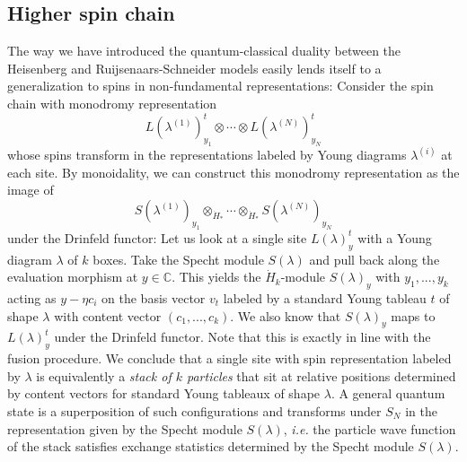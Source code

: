 \documentclass[11pt]{report}
\theoremstyle{definition}
\theoremstyle{remark}
\theoremstyle{remark}
\newcommand{\C}{\mathbb{C}}
\begin{document}
\subsection{Higher spin chain}

The way we have introduced the quantum-classical duality between the Heisenberg and Ruijse\-naars-Schneider models easily lends itself to a generalization to spins in non-fundamental representations: Consider the spin chain with monodromy representation
\begin{equation*}
L(\lambda^{(1)})_{y_1}^t \otimes \cdots \otimes L(\lambda^{(N)})_{y_N}^t
\end{equation*}
whose spins transform in the representations labeled by Young diagrams $\lambda^{(i)}$ at each site. By monoidality, we can construct this monodromy representation as the image of
\begin{equation*}
S(\lambda^{(1)})_{y_1} \otimes_{\dot H_*} \cdots \otimes_{\dot H_*} S(\lambda^{(N)})_{y_N}
\end{equation*}
under the Drinfeld functor: Let us look at a single site $L(\lambda)_y^t$ with a Young diagram $\lambda$ of $k$ boxes. Take the Specht module $S(\lambda)$ and pull back along the evaluation morphism at $y \in \C$. This yields the $\dot H_k$-module $S(\lambda)_y$ with $y_1,...,y_k$ acting as $y - \eta c_i$ on the basis vector $v_t$ labeled by a standard Young tableau $t$ of shape $\lambda$ with content vector $(c_1,...,c_k)$. We also know that $S(\lambda)_y$ maps to $L(\lambda)_y^t$ under the Drinfeld functor. Note that this is exactly in line with the fusion procedure. We conclude that a single site with spin representation labeled by $\lambda$ is equivalently a \emph{stack of $k$ particles} that sit at relative positions determined by content vectors for standard Young tableaux of shape $\lambda$. A general quantum state is a superposition of such configurations and transforms under $S_N$ in the representation given by the Specht module $S(\lambda)$, \emph{i.e.} the particle wave function of the stack satisfies exchange statistics determined by the Specht module $S(\lambda)$.
\end{document}
